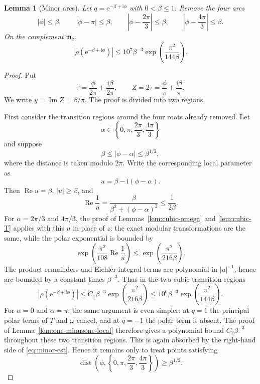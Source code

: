 \documentclass[10pt,a4paper]{amsart}
\newtheorem{lemma}[theorem]{Lemma}
\newcommand{\ii}{\mathrm i}
\newcommand{\e}{\mathrm e}
\newcommand{\Repart}{\operatorname{Re}}
\newcommand{\Impart}{\operatorname{Im}}
\begin{document}
\begin{lemma}[Minor arcs]\label{lem:minor-local}
Let $q=\e^{-\beta+\ii\phi}$ with $0<\beta\leq1$.  Remove the four arcs
\[
|\phi|\leq\beta,
\qquad
|\phi-\pi|\leq\beta,
\qquad
\left|\phi-\frac{2\pi}{3}\right|\leq\beta,
\qquad
\left|\phi-\frac{4\pi}{3}\right|\leq\beta.
\]
On the complement $\mathfrak m_\beta$,
\begin{equation}\label{eq:minor-est}
|\rho(\e^{-\beta+\ii\phi})|
\leq10^7\beta^{-3}\exp\left(\frac{\pi^2}{144\beta}\right).
\end{equation}
\end{lemma}

\begin{proof}
Put
\[
\tau=\frac{\phi}{2\pi}+\frac{\ii\beta}{2\pi},
\qquad
Z=2\tau=\frac{\phi}{\pi}+\frac{\ii\beta}{\pi}.
\]
We write $y=\Impart Z=\beta/\pi$.  The proof is divided into two regions.

First consider the transition regions around the four roots already removed.  Let
\[
\alpha\in\left\{0,\pi,\frac{2\pi}{3},\frac{4\pi}{3}\right\}
\]
and suppose
\[
\beta\leq |\phi-\alpha|\leq \beta^{1/2},
\]
where the distance is taken modulo $2\pi$.  Write the corresponding local parameter as
\[
u=\beta-\ii(\phi-\alpha).
\]
Then $\Repart u=\beta$, $|u|\geq\beta$, and
\[
\Repart\frac1u=\frac{\beta}{\beta^2+(\phi-\alpha)^2}\leq\frac1{2\beta}.
\]
For $\alpha=2\pi/3$ and $4\pi/3$, the proof of Lemmas~\ref{lem:cubic-omega} and
\ref{lem:cubic-T} applies with this $u$ in place of $z$: the exact modular
transformations are the same, while the polar exponential is bounded by
\[
\exp\left(\frac{\pi^2}{108}\Repart\frac1u\right)
\leq
\exp\left(\frac{\pi^2}{216\beta}\right).
\]
The product remainders and Eichler-integral terms are polynomial in $|u|^{-1}$, hence are
bounded by a constant times $\beta^{-3}$.  Thus in the two cubic transition regions
\[
|\rho(\e^{-\beta+\ii\phi})|
\leq
C_1\beta^{-3}\exp\left(\frac{\pi^2}{216\beta}\right)
\leq
10^6\beta^{-3}\exp\left(\frac{\pi^2}{144\beta}\right).
\]
For $\alpha=0$ and $\alpha=\pi$, the same argument is even simpler: at $q=1$ the principal
polar terms of $T$ and $\omega$ cancel, and at $q=-1$ the polar term is absent.  The proof of
Lemma~\ref{lem:one-minusone-local} therefore gives a polynomial bound
$C_2\beta^{-3}$ throughout these two transition regions.  This is again absorbed by the
right-hand side of \eqref{eq:minor-est}.  Hence it remains only to treat points satisfying
\begin{equation}\label{eq:far-from-small-cusps}
\operatorname{dist}\left(\phi,\left\{0,\pi,\frac{2\pi}{3},\frac{4\pi}{3}\right\}\right)
\geq \beta^{1/2}.
\end{equation}


\end{proof}
\end{document}
